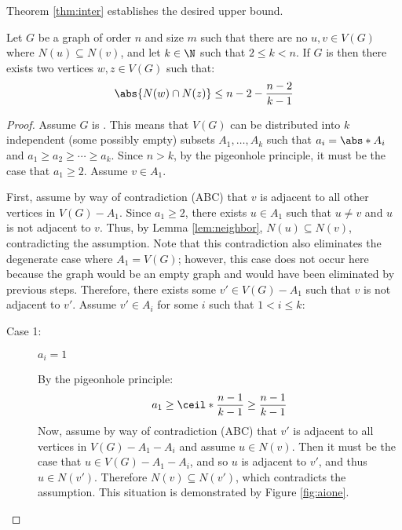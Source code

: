 Theorem \ref{thm:inter} establishes the desired upper bound.

\begin{theorem}
  \label{thm:inter}
  Let \(G\) be a graph of order \(n\) and size \(m\) such that there are no \(u,v\in V(G)\) where \(N(u)\subseteq
  N(v)\), and let \(k\in\N\) such that \(2\le k<n\).  If \(G\) is  then there exists two vertices
  \(w,z\in V(G)\) such that:
  \[\abs{N(w)\cap N(z)}\le n-2-\frac{n-2}{k-1}\]
\end{theorem}

\begin{proof}
  Assume \(G\) is .  This means that \(V(G)\) can be distributed into \(k\) independent (some possibly
  empty) subsets \(A_1,\ldots,A_k\) such that \(a_i=\abs*{A_i}\) and \(a_1\ge a_2\ge\cdots\ge a_k\).  Since
  \(n>k\), by the pigeonhole principle, it must be the case that \(a_1\ge2\).  Assume \(v\in A_1\).

  First, assume by way of contradiction (ABC) that \(v\) is adjacent to all other vertices in \(V(G)-A_1\).  Since
  \(a_1\ge2\), there exists \(u\in A_1\) such that \(u\ne v\) and \(u\) is not adjacent to \(v\).  Thus, by Lemma
  \ref{lem:neighbor}, \(N(u)\subseteq N(v)\), contradicting the assumption.  Note that this contradiction also
  eliminates the degenerate case where \(A_1=V(G)\); however, this case does not occur here because the graph would
  be an empty graph and would have been eliminated by previous steps.  Therefore, there exists some \(v'\in
  V(G)-A_1\) such that \(v\) is not adjacent to \(v'\).  Assume \(v'\in A_i\) for some \(i\) such that \(1<i\le
  k\):

  \begin{description}
  \item [Case 1:] \(a_i=1\)

    By the pigeonhole principle:
    \[a_1\ge\ceil*{\frac{n-1}{k-1}}\ge\frac{n-1}{k-1}\]
    Now, assume by way of contradiction (ABC) that \(v'\) is adjacent to all vertices in \(V(G)-A_1-A_i\) and
    assume \(u\in N(v)\).  Then it must be the case that \(u\in V(G)-A_1-A_i\), and so \(u\) is adjacent to \(v'\),
    and thus \(u\in N(v')\).  Therefore \(N(v)\subseteq N(v')\), which contradicts the assumption.  This situation
    is demonstrated by Figure \ref{fig:aione}.


\end{description}
\end{proof}
